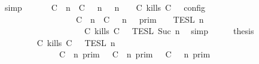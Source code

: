 \begin{isabellebody}
\ simp\isanewline
\ \ \isamarkupfalse%
\ \isamarkupfalse%
\ {\isacartoucheopen}{\isasymlbrakk}\ {\isacharparenleft}{\isacharparenleft}C\ {\isasymUp}\ n{\isacharparenright}\ {\isacharhash}\ {\isacharparenleft}C\ {\isasymnot}{\isasymUp}\ {\isasymge}\ n{\isacharparenright}\ {\isacharhash}\ {\isasymGamma}{\isacharparenright}{\isacharcomma}\ n\ {\isasymTurnstile}\ {\isasymPsi}\ {\isasymtriangleright}\ {\isacharparenleft}{\isacharparenleft}C\ kills\ C\ {\isacharhash}\ {\isasymPhi}{\isacharparenright}\ {\isasymrbrakk}\isactrlsub c\isactrlsub o\isactrlsub n\isactrlsub f\isactrlsub i\isactrlsub g\isanewline
\ \ \ \ \ \ \ \ \ \ \ \ \ \ \ \ {\isacharequal}\ {\isasymlbrakk}{\isasymlbrakk}\ {\isacharparenleft}C\ {\isasymUp}\ n{\isacharparenright}\ {\isacharhash}\ {\isacharparenleft}C\ {\isasymnot}{\isasymUp}\ {\isasymge}\ n{\isacharparenright}\ {\isacharhash}\ {\isasymGamma}\ {\isasymrbrakk}{\isasymrbrakk}\isactrlsub p\isactrlsub r\isactrlsub i\isactrlsub m\ {\isasyminter}\ {\isasymlbrakk}{\isasymlbrakk}\ {\isasymPsi}\ {\isasymrbrakk}{\isasymrbrakk}\isactrlsub T\isactrlsub E\isactrlsub S\isactrlsub L\isactrlbsup {\isasymge}\ n\isactrlesup \isanewline
\ \ \ \ \ \ \ \ \ \ \ \ \ \ \ \ \ \ {\isasyminter}\ {\isasymlbrakk}{\isasymlbrakk}\ {\isacharparenleft}C\ kills\ C\ {\isacharhash}\ {\isasymPhi}\ {\isasymrbrakk}{\isasymrbrakk}\isactrlsub T\isactrlsub E\isactrlsub S\isactrlsub L\isactrlbsup {\isasymge}\ Suc\ n\isactrlesup {\isacartoucheclose}\ \isamarkupfalse%
\ simp\isanewline
\ \ \isamarkupfalse%
\ \isamarkupfalse%
\ {\isacharquery}thesis\isanewline
\ \ \ \ \isamarkupfalse%
\ {\isacharminus}\isanewline
\ \ \ \ \ \ \isamarkupfalse%
\ {\isacartoucheopen}{\isasymlbrakk}{\isasymlbrakk}\ {\isacharparenleft}C\ kills\ C\ {\isacharhash}\ {\isasymPsi}\ {\isasymrbrakk}{\isasymrbrakk}\isactrlsub T\isactrlsub E\isactrlsub S\isactrlsub L\isactrlbsup {\isasymge}\ n\isactrlesup \isanewline
\ \ \ \ \ \ \ \ \ \ \ \ {\isacharequal}\ {\isacharparenleft}{\isasymlbrakk}\ {\isacharparenleft}C\ {\isasymnot}{\isasymUp}\ n{\isacharparenright}\ {\isasymrbrakk}\isactrlsub p\isactrlsub r\isactrlsub i\isactrlsub m\ {\isasymunion}\ {\isasymlbrakk}\ {\isacharparenleft}C\ {\isasymUp}\ n{\isacharparenright}\ {\isasymrbrakk}\isactrlsub p\isactrlsub r\isactrlsub i\isactrlsub m\ {\isasyminter}\ {\isasymlbrakk}\ {\isacharparenleft}C\ {\isasymnot}{\isasymUp}\ {\isasymge}\ n{\isacharparenright}\ {\isasymrbrakk}\isactrlsub p\isactrlsub r\isactrlsub i\isactrlsub m{\isacharparenright}\isanewline

\end{isabellebody}
